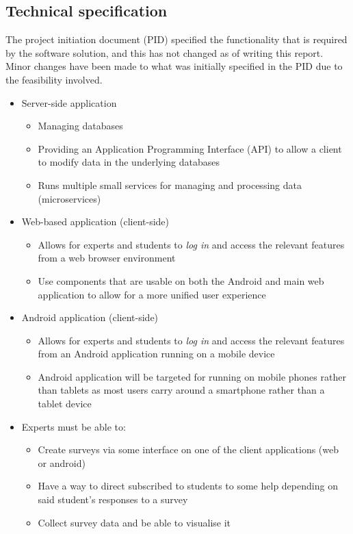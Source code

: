 \subsection{Technical specification}
The project initiation document (PID) specified the functionality that is required by the software solution, and this has not changed as of writing this report.
Minor changes have been made to what was initially specified in the PID due to the feasibility involved.

\begin{itemize}
    \tightlist
    \item Server-side application
    \begin{itemize}
        \item Managing databases
        \item Providing an Application Programming Interface (API) to allow a client to modify data in the underlying databases
        \item Runs multiple small services for managing and processing data (microservices)
    \end{itemize}

    \item Web-based application (client-side)
    \begin{itemize}
        \item Allows for experts and students to \emph{log in} and access the relevant features from a web browser environment
        \item Use components that are usable on both the Android and main web application to allow for a more unified user experience
    \end{itemize}

    \item Android application (client-side)
    \begin{itemize}
        \item Allows for experts and students to \emph{log in} and access the relevant features from an Android application running on a mobile device 
        \item Android application will be targeted for running on mobile phones rather than tablets as most users carry around a smartphone rather than a tablet device
    \end{itemize}

    \item Experts must be able to:
    \begin{itemize}
        \item Create surveys via some interface on one of the client applications (web or android)
        \item Have a way to direct subscribed to students to some help depending on said student's responses to a survey 
        \item Collect survey data and be able to visualise it 
    \end{itemize}
\end{itemize}

